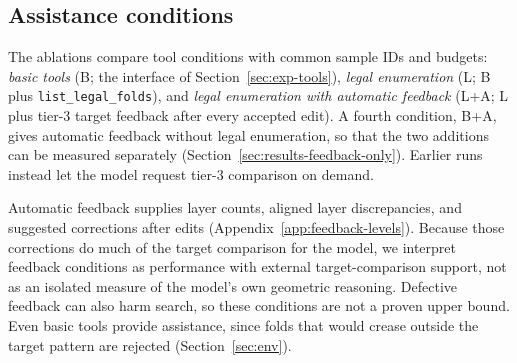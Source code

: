 \subsection{Assistance conditions}
\label{sec:ablations}

The ablations compare tool conditions with common sample IDs and budgets: \emph{basic tools}
(B; the interface of Section~\ref{sec:exp-tools}), \emph{legal enumeration} (L; B plus
\texttt{list\_legal\_folds}), and \emph{legal enumeration with automatic feedback} (L+A; L plus
tier-3 target feedback after every accepted edit). A fourth condition, B+A, gives automatic
feedback without legal enumeration, so that the two additions can be measured separately
(Section~\ref{sec:results-feedback-only}). Earlier runs instead let the model request tier-3
comparison on demand.
\label{tab:ablations}

\label{sec:target-feedback}
Automatic feedback supplies layer counts, aligned layer discrepancies,
and suggested corrections after edits (Appendix~\ref{app:feedback-levels}). Because those
corrections do much of the target comparison for the model, we interpret feedback conditions as performance with external target-comparison support,
not as an isolated measure of the model's own geometric reasoning. Defective feedback can
also harm search, so these conditions are not a proven upper bound. Even basic tools provide assistance,
since folds that would crease outside the target pattern are rejected (Section~\ref{sec:env}).
